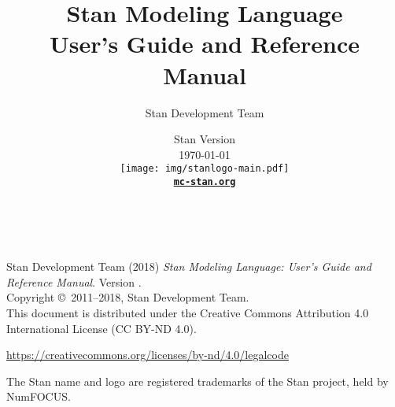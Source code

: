 \title{\Huge\bf Stan Modeling Language \\[4pt] {\LARGE User's Guide
    and Reference Manual}}
\author{Stan Development Team}

\date{\vspace*{36pt} Stan Version \stanversion
\\[8pt] {\small \today}
\\[36pt]
{
\vfill
\texttt{[image: img/stanlogo-main.pdf]}}
\\
\vspace*{6pt}
{\bfseries \href{http://mc-stan.org/}{\tt mc-stan.org}}
}
\maketitle

\newpage
\thispagestyle{empty}
\mbox{ }
\vfill
\begin{center}
\begin{minipage}[t]{0.75\textwidth}
\small
Stan Development Team (2018)
{\it Stan Modeling Language: User's Guide and Reference Manual}. Version
\stanversion.
\vspace*{20pt}
\mbox{ }
\\
Copyright \copyright \ 2011--2018, Stan Development Team.
\vspace*{28pt}
\mbox{} \\
This document is distributed under the Creative Commons Attribution 4.0
International License (CC BY-ND 4.0). 
\begin{center}
\url{https://creativecommons.org/licenses/by-nd/4.0/legalcode}
\end{center}
The Stan name and logo are registered trademarks of the Stan project,
held by NumFOCUS.
\end{minipage}
\vspace*{24pt}
\mbox{ }
\end{center}
